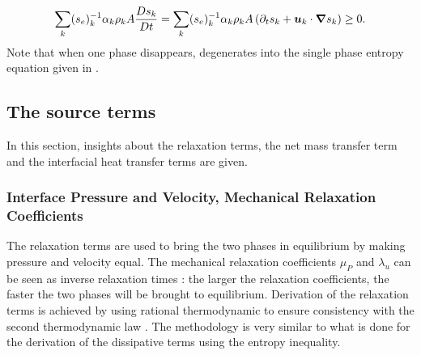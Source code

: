 %
\begin{equation}\label{eq:tot-ent-res-sct4}
\sum_k (s_{e})_k^{-1} \alpha_k \rho_k A \frac{Ds_k}{Dt} = \sum_k (s_{e})_k^{-1} \alpha_k \rho_k A \left( \partial_t s_k + \boldsymbol u_k \cdot \boldsymbol{\nabla} s_k \right) \geq 0.
\end{equation}
%
Note that when one phase disappears,  degenerates into the single phase entropy equation given in .
\subsection{The source terms}\label{sec:source-terms-7-eqt-sect5}
In this section, insights about the relaxation terms, the net mass transfer term and the interfacial heat transfer terms are given.
\subsubsection{Interface Pressure and Velocity, Mechanical Relaxation Coefficients}
The relaxation terms are used to bring the two phases in equilibrium by making pressure and velocity equal. The mechanical relaxation coefficients $\mu_P$ and $\lambda_u$ can be seen as inverse relaxation times  : the larger the relaxation coefficients, the faster the two phases will be brought to equilibrium. Derivation of the relaxation terms is achieved by using rational thermodynamic to ensure consistency with the second thermodynamic law \cite{Truesdell}. The methodology is very similar to what is done for the derivation of the dissipative terms using the entropy inequality.

